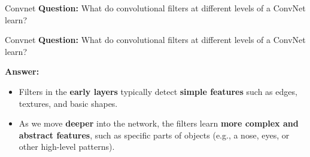 \documentclass[default, aspectratio=169]{beamer}
\begin{document}
	\begin{frame}{Convnet}
		\textbf{Question:}
		What do convolutional filters at different levels of a ConvNet learn?
	\end{frame}
	\begin{frame}{Convnet}
		\textbf{Question:}
		What do convolutional filters at different levels of a ConvNet learn?
		
		\bigskip
		
		\textbf{Answer:}
		\begin{itemize}
			\item Filters in the \textbf{early layers} typically detect \textbf{simple features} such as edges, textures, and basic shapes.
			\item As we move \textbf{deeper} into the network, the filters learn \textbf{more complex and abstract features}, such as specific parts of objects (e.g., a nose, eyes, or other high-level patterns).
		\end{itemize}
	\end{frame}
	
\end{document}
